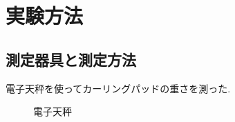 \documentclass[main]{subfiles}
\begin{document}
\chapter{実験方法}
\section{測定器具と測定方法}
電子天秤を使ってカーリングパッドの重さを測った.
\begin{figure}[htbp]
    \centering
    \caption{電子天秤}
    \label{fig:label}
\end{figure}
\end{document}
